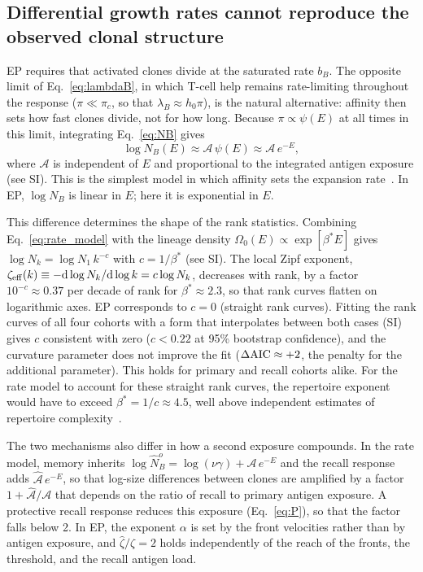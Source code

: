 \documentclass[aps, pre, twocolumn, 10pt, groupedaddress, superscriptaddress, linenumbers]{revtex4-2}
\newcommand{\EQ}{\begin{equation}}
\newcommand{\EE}{\end{equation}}
\newcommand{\DG}{E}
\renewcommand{\d}{{\rm d}}
\newcommand{\lam}{\lambda}
\newcommand{\todo}[1]{{\noindent \color{red} #1}}
\begin{document}
\todo{\subsection*{Differential growth rates cannot reproduce the observed clonal structure}
EP requires that activated clones divide at the saturated rate $b_B$.
The opposite limit of Eq.~\ref{eq:lambdaB}, in which T-cell help remains rate-limiting throughout the response ($\pi \ll \pi_c$, so that $\lam_B \approx h_0\pi$), is the natural alternative: affinity then sets how fast clones divide, not for how long.
Because $\pi \propto \psi(\DG)$ at all times in this limit, integrating Eq.~\ref{eq:NB} gives
\EQ
\log N_B(\DG) \approx \mathcal{A}\,\psi(\DG) \approx \mathcal{A}\, e^{-\DG},
\label{eq:rate_model}
\EE
where $\mathcal{A}$ is independent of $\DG$ and proportional to the integrated antigen exposure (see SI).
This is the simplest model in which affinity sets the expansion rate~\cite{Desponds_2021_Population}.
In EP, $\log N_B$ is linear in $\DG$; here it is exponential in $\DG$.

This difference determines the shape of the rank statistics.
Combining Eq.~\ref{eq:rate_model} with the lineage density $\Omega_0(\DG) \propto \exp{[\beta^*\DG]}$ gives $\log N_k = \log N_1\, k^{-c}$ with $c = 1/\beta^*$ (see SI).
The local Zipf exponent, $\zeta_{\rm eff}(k) \equiv -\d\log N_k/\d\log k = c \log N_k$, decreases with rank, by a factor $10^{-c} \approx 0.37$ per decade of rank for $\beta^* \approx 2.3$, so that rank curves flatten on logarithmic axes.
EP corresponds to $c = 0$ (straight rank curves).
Fitting the rank curves of all four cohorts with a form that interpolates between both cases (SI) gives $c$ consistent with zero ($c < 0.22$ at 95\% bootstrap confidence), and the curvature parameter does not improve the fit ($\Delta{\rm AIC} \approx +2$, the penalty for the additional parameter).
This holds for primary and recall cohorts alike.
For the rate model to account for these straight rank curves, the repertoire exponent would have to exceed $\beta^* = 1/c \approx 4.5$, well above independent estimates of repertoire complexity~\cite{MoranTovar_2024_Primary}.


The two mechanisms also differ in how a second exposure compounds.
In the rate model, memory inherits $\log \hat N_B^o = \log(\nu\gamma) + \mathcal{A}\, e^{-\DG}$ and the recall response adds $\hat{\mathcal{A}}\, e^{-\DG}$, so that log-size differences between clones are amplified by a factor $1 + \hat{\mathcal{A}}/\mathcal{A}$ that depends on the ratio of recall to primary antigen exposure.
A protective recall response reduces this exposure (Eq.~\ref{eq:P}), so that the factor falls below 2.
In EP, the exponent $\alpha$ is set by the front velocities rather than by antigen exposure, and $\hat\zeta/\zeta = 2$ holds independently of the reach of the fronts, the threshold, and the recall antigen load.

}
\end{document}
